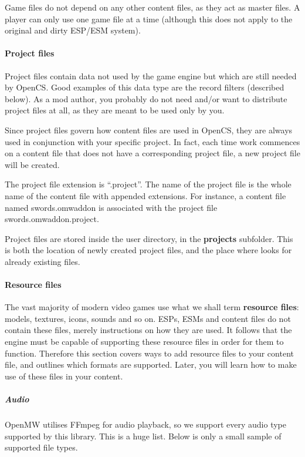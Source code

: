 Game files do not depend on any other content files, as they act as master files. A player can only use one game file at a time
(although this does not apply to the original and dirty ESP/ESM system).

\paragraph{Project files}
Project files contain data not used by the \OMW{} game engine but which are still needed by OpenCS. Good examples of this data type
are the record filters (described below). As a mod author, you probably do not need and/or want to distribute project files at all, 
as they are meant to be used only by you.

Since project files govern how content files are used in OpenCS, they are always used in conjunction with your specific project.
In fact, each time work commences on a content file that does not have a corresponding project file, a new project file will be created. 

The project file extension is ``.project''. The name of the project file is the whole name of the content file with appended extensions. 
For instance, a content file named swords.omwaddon is associated with the project file swords.omwaddon.project.

Project files are stored inside the user directory, in the \textbf{projects} subfolder. This is both the location of newly created 
project files, and the place where \OCS{} looks for already existing files.

\paragraph{Resource files}
The vast majority of modern video games use what we shall term \textbf{resource files}: models, textures, icons, sounds and so on.
ESPs, ESMs and \OMW{} content files do not contain these files, merely instructions on how they are used. It follows that the \OMW{}
engine must be capable of supporting these resource files in order for them to function. Therefore this section covers ways to add 
resource files to your content file, and outlines which formats are supported. Later, you will learn how to make use of these files 
in your content.

\subparagraph{Audio}
OpenMW utilises {FFmpeg} for audio playback, so we support every audio type supported by this library. This is a huge list.
Below is only a small sample of supported file types.

